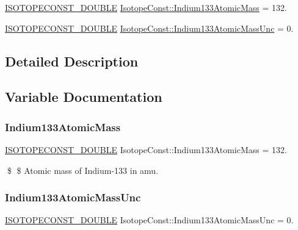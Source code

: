 \begin{DoxyCompactItemize}
\item 
\mbox{\hyperlink{group___isotope_const-_macros_ga8f45a7272ce02c0b4c65c44636ed719a}{I\+S\+O\+T\+O\+P\+E\+C\+O\+N\+S\+T\+\_\+\+D\+O\+U\+B\+LE}} \mbox{\hyperlink{group___isotope_const-_indium-_in133_gafecf94c75170b009a5b72de590053a6e}{Isotope\+Const\+::\+Indium133\+Atomic\+Mass}} = 132.
\item 
\mbox{\hyperlink{group___isotope_const-_macros_ga8f45a7272ce02c0b4c65c44636ed719a}{I\+S\+O\+T\+O\+P\+E\+C\+O\+N\+S\+T\+\_\+\+D\+O\+U\+B\+LE}} \mbox{\hyperlink{group___isotope_const-_indium-_in133_ga819e446da03764543754dc7d8b503785}{Isotope\+Const\+::\+Indium133\+Atomic\+Mass\+Unc}} = 0.
\end{DoxyCompactItemize}


\subsection{Detailed Description}


\subsection{Variable Documentation}
\mbox{\label{group___isotope_const-_indium-_in133_gafecf94c75170b009a5b72de590053a6e}} 
\subsubsection{\texorpdfstring{Indium133\+Atomic\+Mass}{Indium133AtomicMass}}
{\footnotesize\ttfamily \mbox{\hyperlink{group___isotope_const-_macros_ga8f45a7272ce02c0b4c65c44636ed719a}{I\+S\+O\+T\+O\+P\+E\+C\+O\+N\+S\+T\+\_\+\+D\+O\+U\+B\+LE}} Isotope\+Const\+::\+Indium133\+Atomic\+Mass = 132.}

\$ \$ Atomic mass of Indium-\/133 in amu. \mbox{\label{group___isotope_const-_indium-_in133_ga819e446da03764543754dc7d8b503785}} 
\subsubsection{\texorpdfstring{Indium133\+Atomic\+Mass\+Unc}{Indium133AtomicMassUnc}}
{\footnotesize\ttfamily \mbox{\hyperlink{group___isotope_const-_macros_ga8f45a7272ce02c0b4c65c44636ed719a}{I\+S\+O\+T\+O\+P\+E\+C\+O\+N\+S\+T\+\_\+\+D\+O\+U\+B\+LE}} Isotope\+Const\+::\+Indium133\+Atomic\+Mass\+Unc = 0.}

